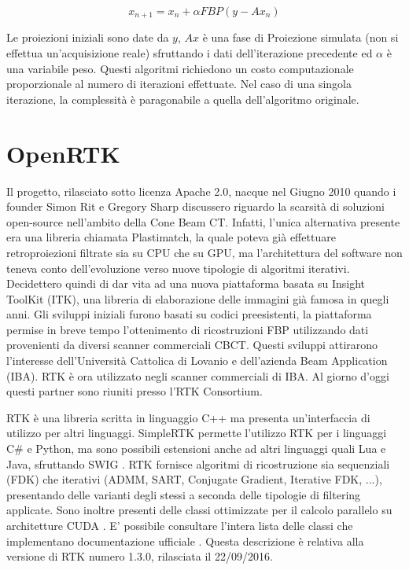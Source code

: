 \documentclass[a4paper,12pt, doubleside]{report}
\begin{document}
                   \begin{equation}
                        x_{n+1} = x_n + \alpha FBP( y - Ax_n)
                    \end{equation}
                    
                    Le proiezioni iniziali sono date da $y$, $Ax$ è una fase di Proiezione simulata (non si effettua un'acquisizione reale) sfruttando i dati dell'iterazione precedente ed $\alpha$ è una variabile peso. Questi algoritmi richiedono un costo computazionale proporzionale al numero di iterazioni effettuate. Nel caso di una singola iterazione, la complessità è paragonabile a quella dell'algoritmo originale.
                    
        \section{OpenRTK}
            \par
                Il progetto, rilasciato sotto licenza Apache 2.0, nacque nel Giugno 2010 quando i founder Simon Rit e Gregory Sharp discussero riguardo la scarsità di soluzioni open-source nell'ambito della Cone Beam CT. Infatti, l'unica alternativa presente era una libreria chiamata Plastimatch, la quale poteva già effettuare retroproiezioni filtrate sia su CPU che su GPU, ma l'architettura del software non teneva conto dell'evoluzione verso nuove tipologie di algoritmi iterativi. Decidettero quindi di dar vita ad una nuova piattaforma basata su Insight ToolKit (ITK), una libreria di elaborazione delle immagini già famosa in quegli anni. Gli sviluppi iniziali furono basati su codici preesistenti, la piattaforma permise in breve tempo l'ottenimento di ricostruzioni FBP utilizzando dati provenienti da diversi scanner commerciali CBCT. Questi sviluppi attirarono l'interesse dell'Università Cattolica di Lovanio e dell'azienda Beam Application (IBA). RTK è ora utilizzato negli scanner commerciali di IBA. Al giorno d'oggi questi partner sono riuniti presso l'RTK Consortium.
            
            \bigskip
            \par
                RTK è una libreria scritta in linguaggio C++ ma presenta un'interfaccia di utilizzo per altri linguaggi. SimpleRTK \cite{simplertk-wiki} permette l'utilizzo RTK per i linguaggi C\# e Python, ma sono possibili estensioni anche ad altri linguaggi quali Lua e Java, sfruttando SWIG \cite{swig-website}.  RTK fornisce algoritmi di ricostruzione sia sequenziali (FDK) che iterativi (ADMM, SART, Conjugate Gradient, Iterative FDK, ...), presentando delle varianti degli stessi a seconda delle tipologie di filtering applicate. Sono inoltre presenti delle classi ottimizzate per il calcolo parallelo su architetture CUDA \cite{cuda}. E' possibile consultare l'intera lista delle classi che implementano documentazione ufficiale \cite{rtk-classi}. 
                Questa descrizione è relativa alla versione di RTK numero 1.3.0, rilasciata il 22/09/2016.
                    
\end{document}
